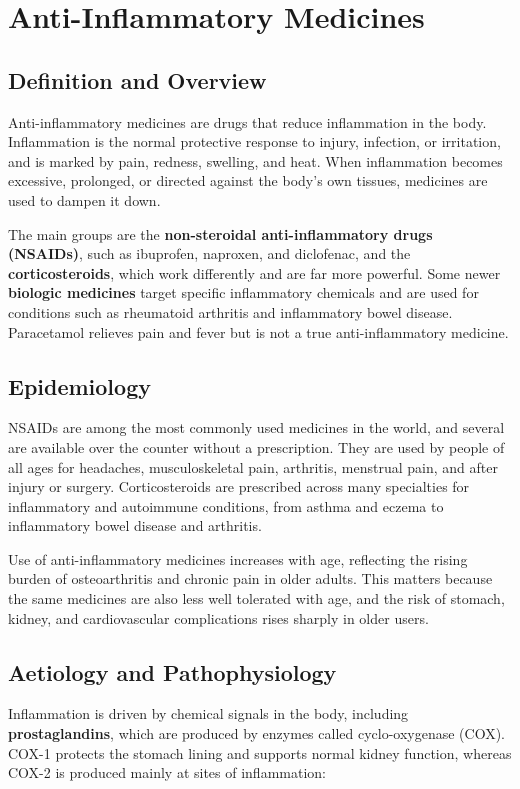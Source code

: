 \chapter{Anti-Inflammatory Medicines}

\section*{Definition and Overview}
Anti-inflammatory medicines are drugs that reduce inflammation in the body. Inflammation is the normal protective response to injury, infection, or irritation, and is marked by pain, redness, swelling, and heat. When inflammation becomes excessive, prolonged, or directed against the body's own tissues, medicines are used to dampen it down.

The main groups are the \textbf{non-steroidal anti-inflammatory drugs (NSAIDs)}, such as ibuprofen, naproxen, and diclofenac, and the \textbf{corticosteroids}, which work differently and are far more powerful. Some newer \textbf{biologic medicines} target specific inflammatory chemicals and are used for conditions such as rheumatoid arthritis and inflammatory bowel disease. Paracetamol relieves pain and fever but is not a true anti-inflammatory medicine.

\section*{Epidemiology}
NSAIDs are among the most commonly used medicines in the world, and several are available over the counter without a prescription. They are used by people of all ages for headaches, musculoskeletal pain, arthritis, menstrual pain, and after injury or surgery. Corticosteroids are prescribed across many specialties for inflammatory and autoimmune conditions, from asthma and eczema to inflammatory bowel disease and arthritis.

Use of anti-inflammatory medicines increases with age, reflecting the rising burden of osteoarthritis and chronic pain in older adults. This matters because the same medicines are also less well tolerated with age, and the risk of stomach, kidney, and cardiovascular complications rises sharply in older users.

\section*{Aetiology and Pathophysiology}
Inflammation is driven by chemical signals in the body, including \textbf{prostaglandins}, which are produced by enzymes called cyclo-oxygenase (COX). COX-1 protects the stomach lining and supports normal kidney function, whereas COX-2 is produced mainly at sites of inflammation:

